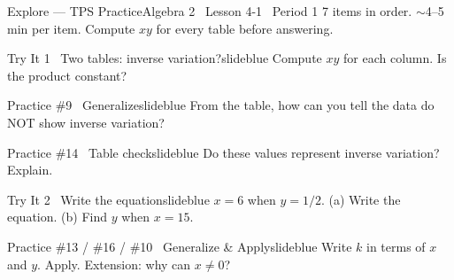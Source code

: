 \documentclass[aspectratio=169, 14pt]{beamer}
\begin{document}
\begin{frame}{Explore --- TPS Practice}{Algebra 2 \textperiodcentered\ Lesson 4-1 \textperiodcentered\ Period 1}
\small\textcolor{slidegray}{7 items in order. \(\sim\)4--5 min per item. Compute \(xy\) for every table before answering.}

\vspace{0.1cm}
\begin{projcard}{Try It 1 \textperiodcentered\ Two tables: inverse variation?}{slideblue}
Compute \(xy\) for each column. Is the product constant?
\end{projcard}
\vspace{-0.2cm}
\begin{projcard}{Practice \#9 \textperiodcentered\ Generalize}{slideblue}
From the table, how can you tell the data do NOT show inverse variation?
\end{projcard}
\vspace{-0.2cm}
\begin{projcard}{Practice \#14 \textperiodcentered\ Table check}{slideblue}
Do these values represent inverse variation? Explain.
\end{projcard}
\vspace{-0.2cm}
\begin{projcard}{Try It 2 \textperiodcentered\ Write the equation}{slideblue}
\(x = 6\) when \(y = 1/2\). (a) Write the equation. (b) Find \(y\) when \(x = 15\).
\end{projcard}
\vspace{-0.2cm}
\begin{projcard}{Practice \#13 / \#16 / \#10 \textperiodcentered\ Generalize \& Apply}{slideblue}
Write \(k\) in terms of \(x\) and \(y\). Apply. Extension: why can \(x \neq 0\)?
\end{projcard}
\end{frame}
\end{document}
